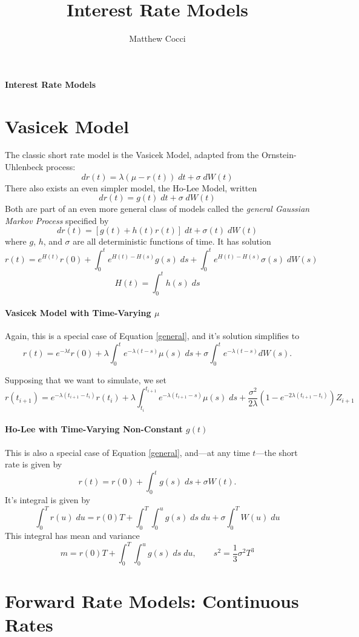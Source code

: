 \documentclass[a4paper,12pt]{scrartcl}
\author{Matthew Cocci}
\title{Interest Rate Models}
\date{}
\begin{document}
 \begin{center}
   \LARGE
   \textbf{Interest Rate Models}
\end{center}

\section{Vasicek Model}

The classic short rate model is the Vasicek Model, adapted from the
Ornstein-Uhlenbeck process:
   \[ dr(t) = \lambda(\mu - r(t))\; dt + \sigma \; dW(t) \]
There also exists an even simpler model, the Ho-Lee Model, written
   \[ dr(t) = g(t) \; dt + \sigma \; dW(t) \]
Both are part of an even more general class of models called the 
\emph{general Gaussian Markov Process} specified by
\begin{equation}
   \label{general}
   dr(t) = \left[g(t) + h(t)r(t)\right]\; dt + \sigma(t) \; dW(t) 
\end{equation}
where $g$, $h$, and $\sigma$ are all deterministic functions of time.
It has solution
   \[ r(t) = e^{H(t)} r(0) + \int^t_0 e^{H(t)-H(s)} g(s)\; ds +
      \int^t_0 e^{H(t)-H(s)} \sigma(s) \; dW(s) \]
   \[ H(t) = \int^t_0 h(s) \; ds \]

\paragraph{Vasicek Model with Time-Varying $\mu$}

Again, this is a special case of Equation \ref{general}, and it's
solution simplifies to
   \[ r(t) = e^{-\lambda t} r(0) + \lambda \int^t_0 e^{-\lambda (t-s)}
      \mu(s) \; ds + \sigma \int^t_0 e^{-\lambda (t-s)} dW(s).\]

Supposing that we want to simulate, we set
   \[ r(t_{i+1}) = e^{-\lambda(t_{i+1}-t_i)} r(t_i) +
      \lambda \int^{t_{i+1}}_{t_i} e^{-\lambda(t_{i+1}-s)} \mu(s) \; ds
      + \frac{\sigma^2}{2\lambda} \left(1-e^{-2\lambda(t_{i+1}-t_i)}
      \right) Z_{i+1} \]

\paragraph{Ho-Lee with Time-Varying Non-Constant $g(t)$} This is also
a special case of Equation \ref{general}, and---at any time $t$---the
short rate is given by
   \[ r(t) = r(0) + \int^t_0 g(s) \; ds + \sigma W(t).\]
It's integral is given by 
   \[ \int^T_0 r(u) \; du = r(0)T + \int^T_0 \int^u_0 g(s) \; ds \; du
      + \sigma \int^T_0 W(u) \; du \]
This integral has mean and variance
   \[ m = r(0)T + \int^T_0 \int^u_0 g(s) \; ds \; du,
      \qquad s^2 = \frac{1}{3}\sigma^2 T^3 \]
   

\section{Forward Rate Models: Continuous Rates}
\end{document}
